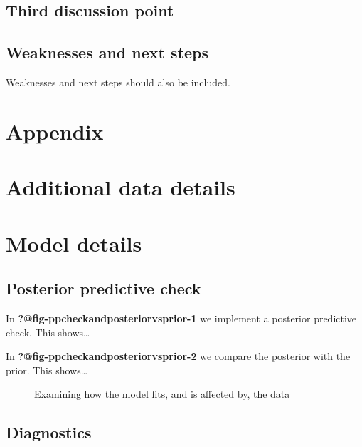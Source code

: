 \documentclass[
  letterpaper,
  DIV=11,
  numbers=noendperiod]{scrartcl}
\begin{document}
\subsection{Third discussion point}\label{third-discussion-point}

\subsection{Weaknesses and next steps}\label{weaknesses-and-next-steps}

Weaknesses and next steps should also be included.

\newpage

\appendix

\section*{Appendix}\label{appendix}

\section{Additional data details}\label{additional-data-details}

\section{Model details}\label{sec-model-details}

\subsection{Posterior predictive
check}\label{posterior-predictive-check}

In \textbf{?@fig-ppcheckandposteriorvsprior-1} we implement a posterior
predictive check. This shows\ldots{}

In \textbf{?@fig-ppcheckandposteriorvsprior-2} we compare the posterior
with the prior. This shows\ldots{}

\begin{figure}

\begin{minipage}{0.50\linewidth}
Examining how the model fits, and is affected by, the
data\end{minipage}%

\end{figure}%

\subsection{Diagnostics}\label{diagnostics}
\end{document}
